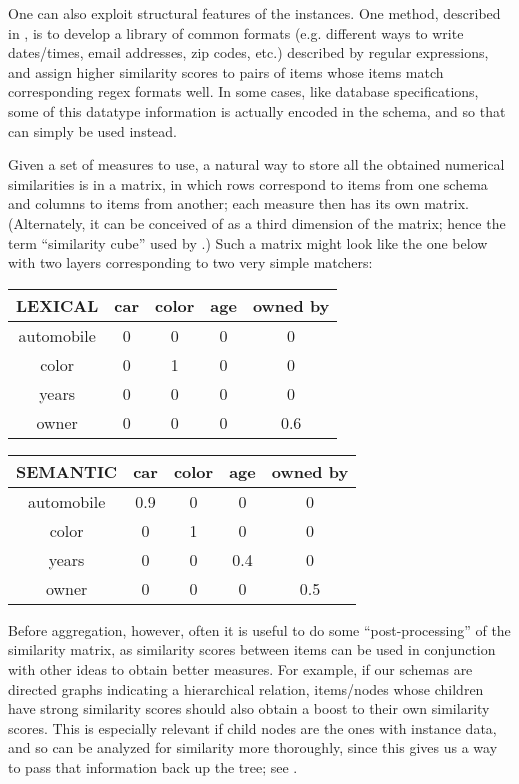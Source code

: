 \documentclass{article}
\theoremstyle{definition}
\theoremstyle{remark}
\begin{document}
One can also exploit structural features of the instances. One method, described in \cite{regex}, is to develop a library of common formats (e.g. different ways to write dates/times, email addresses, zip codes, etc.) described by regular expressions, and assign higher similarity scores to pairs of items whose items match corresponding regex formats well. In some cases, like database specifications, some of this datatype information is actually encoded in the schema, and so that can simply be used instead.

Given a set of measures to use, a natural way to store all the obtained numerical similarities is in a matrix, in which rows correspond to items from one schema and columns to items from another; each measure then has its own matrix. (Alternately, it can be conceived of as a third dimension of the matrix; hence the term ``similarity cube'' used by \cite{coma}.) Such a matrix might look like the one below with two layers corresponding to two very simple matchers:

\begin{tabular}{|c|c|c|c|c|}
	\hline
LEXICAL & car & color & age & owned by \\\hline
automobile & 0 & 0 & 0 & 0 \\\hline
color & 0 & 1 & 0 & 0 \\\hline
years & 0 & 0 & 0 & 0 \\\hline
owner & 0 & 0 & 0 & 0.6 \\\hline
\end{tabular}

\begin{tabular}{|c|c|c|c|c|}
	\hline
	SEMANTIC & car & color & age & owned by \\\hline
	automobile & 0.9 & 0 & 0 & 0 \\\hline
	color & 0 & 1 & 0 & 0 \\\hline
	years & 0 & 0 & 0.4 & 0 \\\hline
	owner & 0 & 0 & 0 & 0.5 \\\hline
\end{tabular}


Before aggregation, however, often it is useful to do some ``post-processing'' of the similarity matrix, as similarity scores between items can be used in conjunction with other ideas to obtain better measures. For example, if our schemas are directed graphs indicating a hierarchical relation, items/nodes whose children have strong similarity scores should also obtain a boost to their own similarity scores. This is especially relevant if child nodes are the ones with instance data, and so can be analyzed for similarity more thoroughly, since this gives us a way to pass that information back up the tree; see \cite{comainstance}. 
\end{document}
